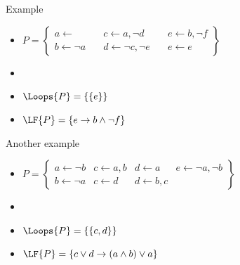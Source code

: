 \begin{frame}{Example}
  \bigskip
  \begin{itemize}
  \item<1->
    \(
    P
    =
    \left\{
      \begin{array}{lll}
        a \leftarrow                  \quad &
        c \leftarrow a, \neg d       \quad &
        e \leftarrow b, \neg f
        \\
        b \leftarrow \neg a         \quad &
        d \leftarrow \neg c, \neg e \quad &
        e \leftarrow e
      \end{array}
    \right\}
    \)
    \bigskip
  \item<1-> []
    \begin{center}
      
    \end{center}
  \item<1-> $\Loops{P}=\{\{e\}\}$
  \item<2-> $\LF{P}=\{e\rightarrow b\wedge\neg f\}$
  \end{itemize}
\end{frame}
\begin{frame}{Another example}
  \bigskip
  \begin{itemize}
  \item<1->
    \(
    P
    =
    \left\{
      \begin{array}{llll}
        a \leftarrow \neg b
      & c \leftarrow a,b
      & d \leftarrow a
      & e \leftarrow\neg a,\neg b
      \\
        b \leftarrow \neg a
      & c \leftarrow d
      & d \leftarrow b,c
      &
      \end{array}
    \right\}
    \)
    \bigskip
  \item<1-> []
    \begin{center}
      
    \end{center}
    \smallskip
  \item<1-> $\Loops{P}=\{\{c,d\}\}$
  \item<2-> $\LF{P}=\{c\vee d\rightarrow (a\wedge b)\vee a\}$
  \end{itemize}
\end{frame}
